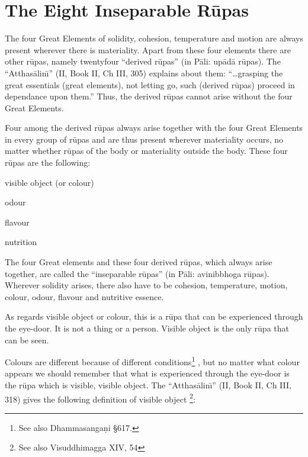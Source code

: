 \documentclass{book}
\begin{document}
\section*{The Eight Inseparable R\=upas}


The four Great Elements of solidity, cohesion, temperature and motion
are always present wherever there is materiality. Apart from these four
elements there are other r\=upas, namely twentyfour ``derived r\=upas''
(in P{\=a}li: up{\=a}d{\=a} r\=upas). The ``Atthas{\=a}lin\=\i'' (II,
Book II, Ch III, 305) explains about them: ``\ldots grasping the great
essentials (great elements), not letting go, such (derived r\=upas)
proceed in dependance upon them.'' Thus, the derived r\=upas cannot
arise without the four Great Elements. 

Four among the derived r\=upas always arise together with the four Great
Elements in every group of r\=upas and are thus present wherever
materiality occurs, no matter whether r\=upas of the body or
materiality outside the body. These four r\=upas are the following: 




\begin{description}
\item visible object (or colour)

\item odour

\item flavour

\item nutrition
\end{description}




The four Great elements and these four derived r\=upas, which always
arise together, are called the ``inseparable r\=upas'' (in P{\=a}li:
avinibbhoga r\=upas). Wherever solidity arises, there also have to be
cohesion, temperature, motion, colour, odour, flavour and nutritive
essence.

As regards visible object or colour, this is a r\=upa that can be
experienced through the eye-door. It is not a thing or a person.
Visible object is the only r\=upa that can be seen.

Colours are different because of different conditions\footnote{See
also Dhamma\-sanga\d ni {\S}617.} , but no matter what colour appears we
should remember that what is experienced through the eye-door is the
r\=upa which is visible, visible object. The ``Atthas{\=a}lin\=\i'' (II,
Book II, Ch III, 318) gives the following definition of visible object
\footnote{See also Visuddhimagga XIV, 54}: 
\end{document}
